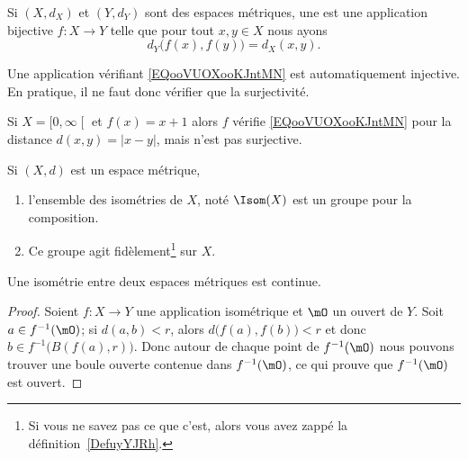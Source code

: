 \begin{definition}
	Si \( (X,d_X)\) et \( (Y,d_Y)\) sont des espaces métriques, une  est une application bijective \( f\colon X\to Y\) telle que pour tout \( x,y\in X\) nous ayons
	\begin{equation}        \label{EQooVUOXooKJntMN}
		d_Y\big( f(x),f(y) \big)=d_X(x,y).
	\end{equation}
\end{definition}

\begin{remark}
	Une application vérifiant \eqref{EQooVUOXooKJntMN} est automatiquement injective. En pratique, il ne faut donc vérifier que la surjectivité.
\end{remark}

\begin{example}
	Si \( X=\mathopen[ 0 , \infty \mathclose[\) et \( f(x)=x+1\) alors \( f\) vérifie \eqref{EQooVUOXooKJntMN} pour la distance \( d(x,y)=| x-y |\), mais n'est pas surjective.
\end{example}

\begin{propositionDef}
	Si \( (X,d)\) est un espace métrique,
	\begin{enumerate}
		\item
		      l'ensemble des isométries de \( X\), noté \( \Isom(X)\) est un groupe pour la composition.
		\item
		      Ce groupe agit fidèlement\footnote{Si vous ne savez pas ce que c'est, alors vous avez zappé la définition~\ref{DefuyYJRh}.} sur \( X\).
	\end{enumerate}
\end{propositionDef}
\begin{proposition}\label{PropLYMgVMJ}
	Une isométrie entre deux espaces métriques est continue.
\end{proposition}

\begin{proof}
	Soient \( f\colon X\to Y\) une application isométrique et \( \mO\) un ouvert de \( Y\). Soit \( a\in f^{-1}(\mO)\); si \( d(a,b)<r\), alors \( d\big( f(a),f(b) \big)<r\) et donc \( b\in f^{-1}\big( B(f(a),r) \big)\). Donc autour de chaque point de \( f^{-1}(\mO)\) nous pouvons trouver une boule ouverte contenue dans \( f^{-1}(\mO)\), ce qui prouve que \( f^{-1}(\mO)\) est ouvert.
\end{proof}

